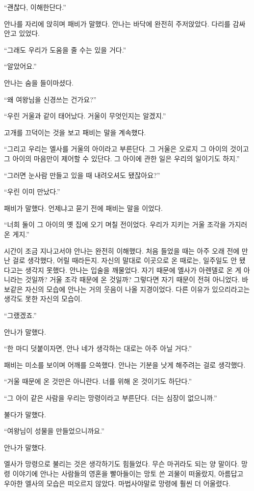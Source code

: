 ``괜찮다, 이해한단다.''

안나를 자리에 앉히며 패비가 말했다. 안나는 바닥에 완전히 주저앉았다. 다리를 감싸 안고 있었다.

``그래도 우리가 도움을 줄 수는 있을 거다.''

``알았어요.''

안나는 숨을 들이마셨다.

``왜 여왕님을 신경쓰는 건가요?''

``우린 거울과 같이 태어났다. 거울이 무엇인지는 알겠지.''

고개를 끄덕이는 것을 보고 패비는 말을 계속했다.

``그리고 우리는 엘사를 거울의 아이라고 부른단다. 그 거울은 오로지 그 아이의 것이고 그 아이의 마음만이 제어할 수 있단다. 그 아이에 관한 일은 우리의 일이기도 하지.''

``그러면 눈사람 만들고 있을 때 내려오셔도 됐잖아요?''

``우린 이미 만났다.''

패비가 말했다. 언제냐고 묻기 전에 패비는 말을 이었다.

``너희 둘이 그 아이의 옛 집에 오기 며칠 전이었다. 우리가 지키는 거울 조각을 가지러 온 게지.''

시간이 조금 지나고서야 안나는 완전히 이해했다. 처음 들었을 때는 아주 오래 전에 만난 걸로 생각했다, 어릴 때라든지. 자신의 말대로 이곳으로 온 때로는, 일주일도 안 됐다고는 생각지 못했다. 안나는 입술을 깨물었다. 자기 때문에 엘사가 아렌델로 온 게 아니라는 것일까? 거울 조각 때문에 온 것일까? 그렇다면 자기 때문이 전혀 아니었다. 바보같은 자신의 모습에 안나는 거의 웃음이 나올 지경이었다. 다른 이유가 있으리라고는 생각도 못한 자신의 모습이.

``그랬겠죠.''

안나가 말했다.

``한 마디 덧붙이자면, 안나 네가 생각하는 대로는 아주 아닐 거다.''

패비는 미소를 보이며 어깨를 으쓱했다. 안나는 기분을 낫게 해주려는 걸로 생각했다.

``거울 때문에 온 것만은 아니란다. 너를 위해 온 것이기도 하단다.''

``그 아이 같은 사람을 우리는 망령이라고 부른단다. 더는 심장이 없으니까.''

불다가 말했다.

``여왕님이 성물을 만들었으니까요.''

안나가 말했다.

엘사가 망령으로 불리는 것은 생각하기도 힘들었다. 무슨 마귀라도 되는 양 말이다. 망령 이야기에 안나는 사람들의 영혼을 빨아들이는 망토 쓴 괴물이 떠올랐지, 아름답고 우아한 엘사의 모습은 떠오르지 않았다. 마법사야말로 망령에 훨씬 더 어울렸다.

